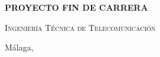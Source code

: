 \begin{titlepage}
	\begin{center}\Large\textbf{\textsf{PROYECTO FIN DE CARRERA}}\end{center}
	
	\medskip
	
	\begin{center}
		\Huge
		\sffamily\scshape
		\pfctitlename
	\end{center}
	
	\medskip
	
	\begin{center}
		\Huge
		\scshape%
		\textsf{Ingeniería Técnica de Telecomunicación}
	\end{center}
	
	\vfill
	
	{\large Málaga, \pfcanno \hfill \pfcauthorname}
\end{titlepage}

